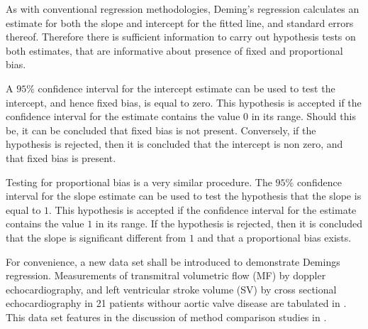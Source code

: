 \documentclass[MAIN.tex]{subfiles}
\begin{document}
	
	As with conventional regression methodologies, Deming's regression
	calculates an estimate for both the slope and intercept for the
	fitted line, and standard errors thereof. Therefore there is
	sufficient information to carry out hypothesis tests on both
	estimates, that are informative about presence of fixed and
	proportional bias.
	
	A $95\%$ confidence interval for the intercept estimate can be
	used to test the intercept, and hence fixed bias, is equal to
	zero. This hypothesis is accepted if the confidence interval for
	the estimate contains the value $0$ in its range. Should this be,
	it can be concluded that fixed bias is not present. Conversely, if
	the hypothesis is rejected, then it is concluded that the
	intercept is non zero, and that fixed bias is present.
	
	Testing for proportional bias is a very similar procedure. The
	$95\%$ confidence interval for the slope estimate can be used to
	test the hypothesis that the slope is equal to $1$. This
	hypothesis is accepted if the confidence interval for the estimate
	contains the value $1$ in its range. If the hypothesis is
	rejected, then it is concluded that the slope is significant
	different from $1$ and that a proportional bias exists.
	
	For convenience, a new data set shall be introduced to demonstrate
	Demings regression. Measurements of transmitral volumetric flow
	(MF) by doppler echocardiography, and left ventricular stroke
	volume (SV) by cross sectional echocardiography in 21 patients
	withour aortic valve disease are tabulated in \citet{zhang}. This
	data set features in the discussion of method comparison studies
	in \citet[p.398]{images/AltmanBook} .
	
\end{document}

